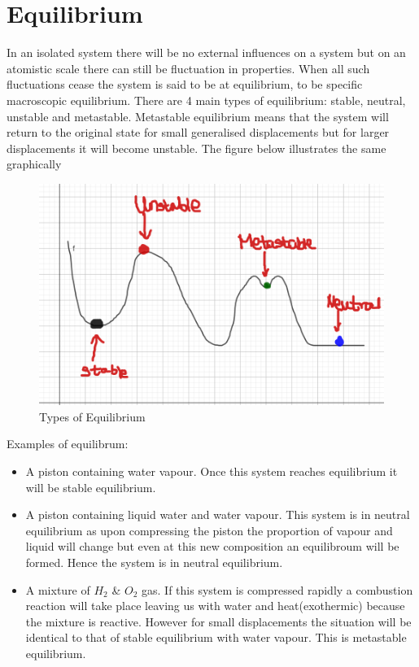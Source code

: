 \documentclass[12pt]{article}
\begin{document}
\section{Equilibrium}
    In an isolated system there will be no external influences on a system but on an atomistic scale there can still be fluctuation in properties. When all such fluctuations cease the system is said to be at equilibrium, to be specific macroscopic equilibrium. There are 4 main types of equilibrium: stable, neutral, unstable and metastable. Metastable equilibrium means that the system will return to the original state for small generalised displacements but for larger displacements it will become unstable. The figure below illustrates the same graphically \\
    
    
    \begin{figure}[h]
    	\includegraphics[scale=0.3]{resize_eqb.png}
    	\centering
    	\caption{Types of Equilibrium}
    	
    \end{figure}
    Examples of equilibrum:
   \begin{itemize}
   	\item A piston containing water vapour. Once this system reaches equilibrium it will be stable equilibrium. 
   	
   	\item A piston containing liquid water and water vapour. This system is in neutral equilibrium as upon compressing the piston the proportion of vapour and liquid will change but even at this new composition an equilibroum will be formed. Hence the system is in neutral equilibrium.
   	
   	\item A mixture of $H_2$ \& $O_2$ gas. If this system is compressed rapidly a combustion reaction will take place leaving us with water and heat(exothermic) because the mixture is reactive. However for small displacements the situation will be identical to that of stable equilibrium with water vapour. This is metastable equilibrium.
   \end{itemize}
    
\end{document}
